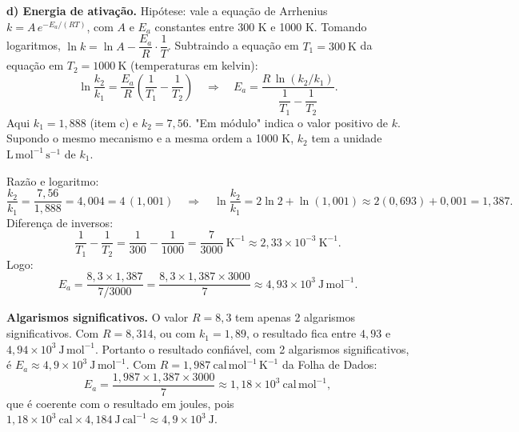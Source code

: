 \documentclass{article}%
\begin{document}
\textbf{d) Energia de ativação.} Hipótese: vale a equação de Arrhenius $k = A\,e^{-E_a/(RT)}$, com $A$ e $E_a$ constantes entre 300 K e 1000 K. Tomando logaritmos, $\ln k = \ln A - \dfrac{E_a}{R}\cdot\dfrac{1}{T}$. Subtraindo a equação em $T_1 = 300\ \mathrm{K}$ da equação em $T_2 = 1000\ \mathrm{K}$ (temperaturas em kelvin):
\[
\ln\frac{k_2}{k_1} = \frac{E_a}{R}\left(\frac{1}{T_1}-\frac{1}{T_2}\right)
\quad\Rightarrow\quad
E_a = \frac{R\,\ln(k_2/k_1)}{\dfrac{1}{T_1}-\dfrac{1}{T_2}}.
\]
Aqui $k_1 = 1{,}888$ (item c) e $k_2 = 7{,}56$. "Em módulo" indica o valor positivo de $k$. Supondo o mesmo mecanismo e a mesma ordem a 1000 K, $k_2$ tem a unidade $\mathrm{L\,mol^{-1}\,s^{-1}}$ de $k_1$.

Razão e logaritmo:
\[
\frac{k_2}{k_1} = \frac{7{,}56}{1{,}888} = 4{,}004 = 4\,(1{,}001)
\quad\Rightarrow\quad
\ln\frac{k_2}{k_1} = 2\ln 2 + \ln(1{,}001) \approx 2(0{,}693) + 0{,}001 = 1{,}387.
\]
Diferença de inversos:
\[
\frac{1}{T_1}-\frac{1}{T_2} = \frac{1}{300}-\frac{1}{1000} = \frac{7}{3000}\ \mathrm{K^{-1}} \approx 2{,}33\times 10^{-3}\ \mathrm{K^{-1}}.
\]
Logo:
\[
E_a = \frac{8{,}3 \times 1{,}387}{7/3000} = \frac{8{,}3 \times 1{,}387 \times 3000}{7} \approx 4{,}93\times 10^{3}\ \mathrm{J\,mol^{-1}}.
\]

\textbf{Algarismos significativos.} O valor $R = 8{,}3$ tem apenas 2 algarismos significativos. Com $R = 8{,}314$, ou com $k_1 = 1{,}89$, o resultado fica entre $4{,}93$ e $4{,}94\times 10^{3}\ \mathrm{J\,mol^{-1}}$. Portanto o resultado confiável, com 2 algarismos significativos, é $E_a \approx 4{,}9\times 10^{3}\ \mathrm{J\,mol^{-1}}$. Com $R = 1{,}987\ \mathrm{cal\,mol^{-1}\,K^{-1}}$ da Folha de Dados:
\[
E_a = \frac{1{,}987 \times 1{,}387 \times 3000}{7} \approx 1{,}18\times 10^{3}\ \mathrm{cal\,mol^{-1}},
\]
que é coerente com o resultado em joules, pois $1{,}18\times 10^{3}\ \mathrm{cal} \times 4{,}184\ \mathrm{J\,cal^{-1}} \approx 4{,}9\times 10^{3}\ \mathrm{J}$.
\end{document}
